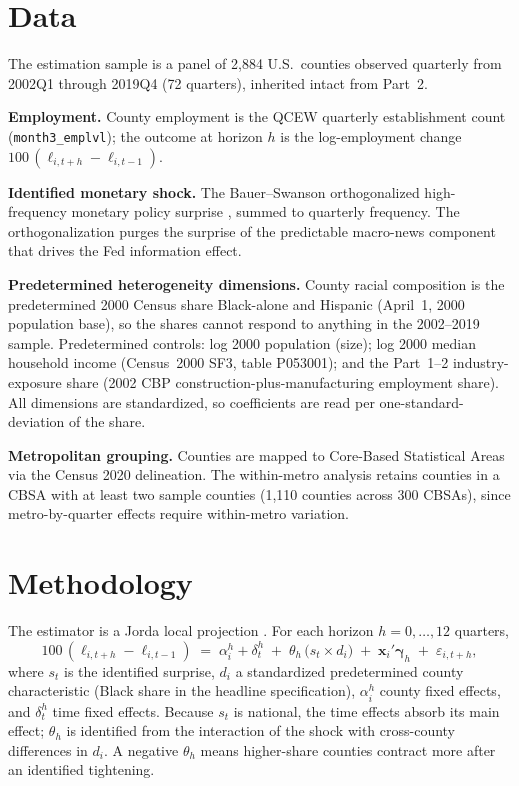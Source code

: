 \documentclass[11pt]{article}
\begin{document}
\section{Data}
The estimation sample is a panel of 2{,}884 U.S.\ counties observed quarterly from 2002Q1
through 2019Q4 (72 quarters), inherited intact from Part~2.

\textbf{Employment.} County employment is the QCEW quarterly establishment count
(\texttt{month3\_emplvl}); the outcome at horizon $h$ is the log-employment change
$100\,(\ell_{i,t+h}-\ell_{i,t-1})$.

\textbf{Identified monetary shock.} The Bauer--Swanson orthogonalized high-frequency
monetary policy surprise \citep{BauerSwanson2023}, summed to quarterly frequency. The
orthogonalization purges the surprise of the predictable macro-news component that drives
the Fed information effect.

\textbf{Predetermined heterogeneity dimensions.} County racial composition is the
predetermined 2000 Census share Black-alone and Hispanic (April~1, 2000 population base),
so the shares cannot respond to anything in the 2002--2019 sample. Predetermined controls:
log 2000 population (size); log 2000 median household income (Census~2000 SF3, table
P053001); and the Part~1--2 industry-exposure share (2002 CBP construction-plus-manufacturing
employment share). All dimensions are standardized, so coefficients are read per
one-standard-deviation of the share.

\textbf{Metropolitan grouping.} Counties are mapped to Core-Based Statistical Areas via the
Census 2020 delineation. The within-metro analysis retains counties in a CBSA with at least
two sample counties (1{,}110 counties across 300 CBSAs), since metro-by-quarter effects
require within-metro variation.

\section{Methodology}
The estimator is a Jorda local projection \citep{Jorda2005}. For each horizon
$h = 0,\dots,12$ quarters,
\begin{equation}
100\,(\ell_{i,t+h}-\ell_{i,t-1}) \;=\; \alpha_i^h + \delta_t^h
   \;+\; \theta_h \,\bigl(s_t \times d_i\bigr) \;+\; \mathbf{x}_{i}'\boldsymbol{\gamma}_h \;+\; \varepsilon_{i,t+h},
\label{eq:lp}
\end{equation}
where $s_t$ is the identified surprise, $d_i$ a standardized predetermined county
characteristic (Black share in the headline specification), $\alpha_i^h$ county fixed
effects, and $\delta_t^h$ time fixed effects. Because $s_t$ is national, the time effects
absorb its main effect; $\theta_h$ is identified from the interaction of the shock with
cross-county differences in $d_i$. A negative $\theta_h$ means higher-share counties contract
more after an identified tightening.
\end{document}
